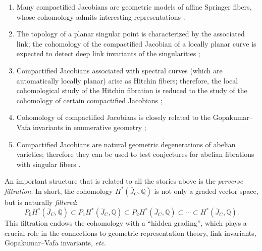 \documentclass{pspum-l}
\theoremstyle{plain}
\theoremstyle{definition}
\theoremstyle{remark}
\newcommand{\BQ}{{\mathbb{Q}}}
\begin{document}
\begin{enumerate}
    \item[$\bullet$] Many compactified Jacobians are geometric models of affine Springer fibers, whose cohomology admits interesting representations \cite{L, OY, OY2, GORS}. 
    \item[$\bullet$] The topology of a planar singular point is characterized by the associated link; the cohomology of the compactified Jacobian of a locally planar curve is expected to detect deep link invariants of the singularities \cite{ORS, Sh0}; 
    \item[$\bullet$] Compactified Jacobians associated with spectral curves (which are automatically locally planar) arise as Hitchin fibers; therefore, the local cohomological study of the Hitchin fibration is reduced to the study of the cohomology of certain compactified Jacobians \cite{Ngo, CL, MS_chi};
    \item[$\bullet$]  Cohomology of compactified Jacobians is closely related to the Gopakumar--Vafa invariants in enumerative geometry \cite{MT,MY, MS, DK};
    \item[$\bullet$]  Compactified Jacobians are natural geometric degenerations of abelian varieties; therefore they can be used to test conjectures for abelian fibrations with singular fibers \cite{MSY, MSY2, BMSY1}.
\end{enumerate}


An important structure that is related to all the stories above is the \emph{perverse filtration}. In short, the cohomology $H^*(\overline{J}_C, \BQ)$ is not only a graded vector space, but is naturally \emph{filtered}:
\begin{equation}\label{perv_filtration}
P_0H^*(\overline{J}_C, \BQ) \subset P_1H^*(\overline{J}_C, \BQ) \subset  P_2H^*(\overline{J}_C, \BQ) \subset \cdots \subset H^*(\overline{J}_C, \BQ).
\end{equation}
This filtration endows the cohomology with a ``hidden grading'', which plays a crucial role in the connections to geometric representation theory, link invariants, Gopakumar--Vafa invariants, \emph{etc}.
\end{document}
